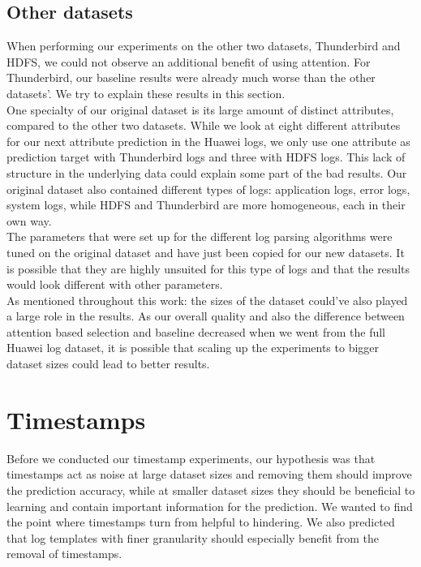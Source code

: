 \subsection{Other datasets}
When performing our experiments on the other two datasets, Thunderbird and HDFS, we could not observe an additional benefit of using attention. For Thunderbird, our baseline results were already much worse than the other datasets'. We try to explain these results in this section.\\

One specialty of our original dataset is its large amount of distinct attributes, compared to the other two datasets. While we look at eight different attributes for our next attribute prediction in the Huawei logs, we only use one attribute as prediction target with Thunderbird logs and three with HDFS logs. This lack of structure in the underlying data could explain some part of the bad results. Our original dataset also contained different types of logs: application logs, error logs, system logs, while HDFS and Thunderbird are more homogeneous, each in their own way. \\

The parameters that were set up for the different log parsing algorithms were tuned on the original dataset and have just been copied for our new datasets. It is possible that they are highly unsuited for this type of logs and that the results would look different with other parameters. \\

As mentioned throughout this work: the sizes of the dataset could've also played a large role in the results. As our overall quality and also the difference between attention based selection and baseline decreased when we went from the full Huawei log dataset, it is possible that scaling up the experiments to bigger dataset sizes could lead to better results. 

\section{Timestamps}
Before we conducted our timestamp experiments, our hypothesis was that timestamps act as noise at large dataset sizes and removing them should improve the prediction accuracy, while at smaller dataset sizes they should be beneficial to learning and contain important information for the prediction. We wanted to find the point where timestamps turn from helpful to hindering. We also predicted that log templates with finer granularity should especially benefit from the removal of timestamps. \\

